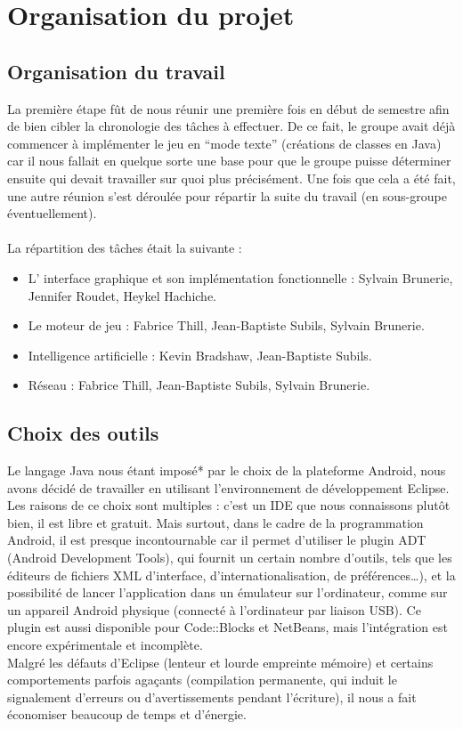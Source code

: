 \documentclass[a4paper]{report}
\begin{document}
\chapter{Organisation du projet}
	\section{Organisation du travail}


		La première étape fût de nous réunir une première fois en début de semestre afin de bien cibler la chronologie des tâches à effectuer. De ce fait, le groupe avait déjà commencer à 			implémenter le jeu en “mode texte” (créations de classes en Java) car il nous fallait en quelque sorte une base pour que le groupe puisse déterminer ensuite qui devait travailler sur 			quoi plus précisément. Une fois que cela a été fait, une autre réunion s’est déroulée pour répartir la suite du travail (en sous-groupe éventuellement).\\
		\\ 
		La répartition des tâches était la suivante :\\
		\begin{itemize}
			\item L’ interface graphique et son implémentation fonctionnelle : Sylvain Brunerie, Jennifer Roudet, Heykel Hachiche.
			\item Le moteur de jeu : Fabrice Thill, Jean-Baptiste Subils, Sylvain Brunerie.
			\item Intelligence artificielle : Kevin Bradshaw, Jean-Baptiste Subils.
			\item Réseau : Fabrice Thill, Jean-Baptiste Subils, Sylvain Brunerie.
		\end{itemize}
	
	\section{Choix des outils}
		Le langage Java nous étant imposé* par le choix de la plateforme Android, nous avons décidé de travailler en utilisant l’environnement de développement Eclipse. Les raisons de ce choix 			sont multiples : c’est un IDE que nous connaissons plutôt bien, il est libre et gratuit. Mais surtout, dans le cadre de la programmation Android, il est presque incontournable car 		il permet d’utiliser le plugin ADT (Android Development Tools), qui fournit un certain nombre d’outils, tels que les éditeurs de fichiers XML d’interface, d’internationalisation, de 			préférences…), et la possibilité de lancer l’application dans un émulateur sur l’ordinateur, comme sur un appareil Android physique (connecté à l’ordinateur par liaison USB). Ce plugin est aussi disponible pour Code::Blocks et NetBeans, mais l’intégration est encore expérimentale et incomplète.\\
		Malgré les défauts d’Eclipse (lenteur et lourde empreinte mémoire) et certains comportements parfois agaçants (compilation permanente, qui induit le signalement d’erreurs ou d’avertissements 		pendant l’écriture), il nous a fait économiser beaucoup de temps et d’énergie.\\
\end{document}
